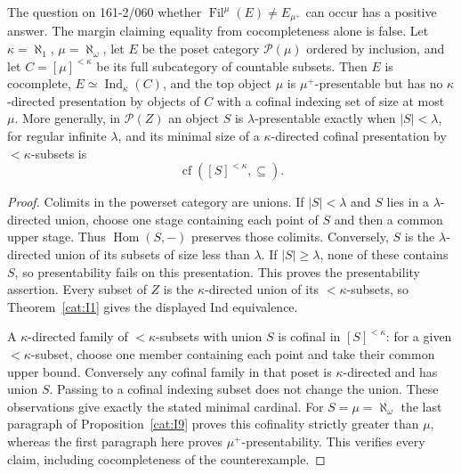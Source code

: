 \begin{proposition}\label{cat:I10}
The question on 161-2/060 whether
$\operatorname{Fil}^{\mu}(E)\ne E_{\mu^+}$ can occur has a positive
answer.  The margin claiming equality from cocompleteness alone is
false.  Let $\kappa=\aleph_1$, $\mu=\aleph_\omega$, let $E$ be the
poset category $\mathcal P(\mu)$ ordered by inclusion, and let
$C=[\mu]^{<\kappa}$ be its full subcategory of countable subsets.
Then $E$ is cocomplete, $E\simeq\operatorname{Ind}_\kappa(C)$, and
the top object $\mu$ is $\mu^+$-presentable but has no
$\kappa$-directed presentation by objects of $C$ with a cofinal
indexing set of size at most $\mu$.
More generally, in $\mathcal P(Z)$ an object $S$ is
$\lambda$-presentable exactly when $|S|<\lambda$, for regular
infinite $\lambda$, and its minimal size of a
$\kappa$-directed cofinal presentation by $<\kappa$-subsets is
\[
 \operatorname{cf}([S]^{<\kappa},\subseteq).
\]
\end{proposition}
\begin{proof}
Colimits in the powerset category are unions.  If $|S|<\lambda$ and
$S$ lies in a $\lambda$-directed union, choose one stage containing
each point of $S$ and then a common upper stage.  Thus
$\operatorname{Hom}(S,-)$ preserves those colimits.
Conversely, $S$ is the $\lambda$-directed union of its subsets of
size less than $\lambda$.  If $|S|\geq\lambda$, none of these
contains $S$, so presentability fails on this presentation.
This proves the presentability assertion.
Every subset of $Z$ is the $\kappa$-directed union of its
$<\kappa$-subsets, so Theorem~\ref{cat:I1} gives the displayed
Ind equivalence.

A $\kappa$-directed family of $<\kappa$-subsets with union $S$
is cofinal in $[S]^{<\kappa}$: for a given $<\kappa$-subset,
choose one member containing each point and take their common upper
bound.  Conversely any cofinal family in that poset is
$\kappa$-directed and has union $S$.  Passing to a cofinal indexing
subset does not change the union.  These observations give exactly
the stated minimal cardinal.
For $S=\mu=\aleph_\omega$ the last paragraph of
Proposition~\ref{cat:I9} proves this cofinality strictly greater
than $\mu$, whereas the first paragraph here proves
$\mu^+$-presentability.  This verifies every claim, including
cocompleteness of the counterexample.
\end{proof}

